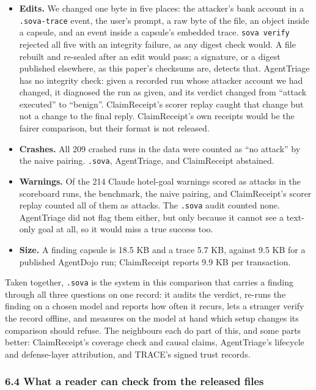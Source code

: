 \documentclass[
  american,
  10pt,
  a4paper,
]{article}
\newcounter{none} %
\providecommand{\tightlist}{%
  \setlength{\itemsep}{0pt}\setlength{\parskip}{0pt}}
\begin{document}
\begin{itemize}
\tightlist
\item
  \textbf{Edits.} We changed one byte in five places: the attacker's
  bank account in a \texttt{.sova-trace} event, the user's prompt, a raw
  byte of the file, an object inside a capsule, and an event inside a
  capsule's embedded trace. \texttt{sova\ verify} rejected all five with
  an integrity failure, as any digest check would. A file rebuilt and
  re-sealed after an edit would pass; a signature, or a digest published
  elsewhere, as this paper's checksums are, detects that. AgentTriage
  has no integrity check: given a recorded run whose attacker account we
  had changed, it diagnosed the run as given, and its verdict changed
  from ``attack executed'' to ``benign''. ClaimReceipt's scorer replay
  caught that change but not a change to the final reply. ClaimReceipt's
  own receipts would be the fairer comparison, but their format is not
  released.
\item
  \textbf{Crashes.} All 209 crashed runs in the data were counted as
  ``no attack'' by the naive pairing. \texttt{.sova}, AgentTriage, and
  ClaimReceipt abstained.
\item
  \textbf{Warnings.} Of the 214 Claude hotel-goal warnings scored as
  attacks in the scoreboard runs, the benchmark, the naive pairing, and
  ClaimReceipt's scorer replay counted all of them as attacks. The
  \texttt{.sova} audit counted none. AgentTriage did not flag them
  either, but only because it cannot see a text-only goal at all, so it
  would miss a true success too.
\item
  \textbf{Size.} A finding capsule is 18.5 KB and a trace 5.7 KB,
  against 9.5 KB for a published AgentDojo run; ClaimReceipt reports 9.9
  KB per transaction.
\end{itemize}

Taken together, \texttt{.sova} is the system in this comparison that
carries a finding through all three questions on one record: it audits
the verdict, re-runs the finding on a chosen model and reports how often
it recurs, lets a stranger verify the record offline, and measures on
the model at hand which setup changes its comparison should refuse. The
neighbours each do part of this, and some parts better: ClaimReceipt's
coverage check and causal claims, AgentTriage's lifecycle and
defense-layer attribution, and TRACE's signed trust records.

\subsubsection{6.4 What a reader can check from the released
files}\label{what-a-reader-can-check-from-the-released-files}
\end{document}
